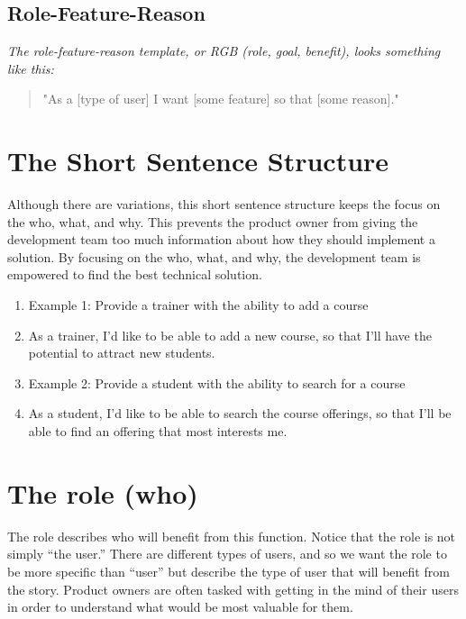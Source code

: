 \subsection{Role-Feature-Reason}

\emph{The role-feature-reason template, or RGB (role, goal, benefit), looks something like this:}

\begin{quote}
    "As a [type of user] I want [some feature] so that [some reason]."
\end{quote}

\section{The Short Sentence Structure}
Although there are variations, this short sentence structure keeps the focus on the who, what, and why. This prevents the product owner from giving the development team too much information about how they should implement a solution. By focusing on the who, what, and why, the development team is empowered to find the best technical solution.

\begin{enumerate}
    \item Example 1: Provide a trainer with the ability to add a course

   \item As a trainer, I’d like to be able to add a new course, so that I’ll have the potential to attract new students.

   \item Example 2: Provide a student with the ability to search for a course

   \item As a student, I’d like to be able to search the course offerings, so that I’ll be able to find an offering that most interests me.
\end{enumerate}

\section{The role (who)}

The role describes who will benefit from this function. Notice that the role is not simply “the user.” There are different types of users, and so we want the role to be more specific than “user” but describe the type of user that will benefit from the story. Product owners are often tasked with getting in the mind of their users in order to understand what would be most valuable for them.

